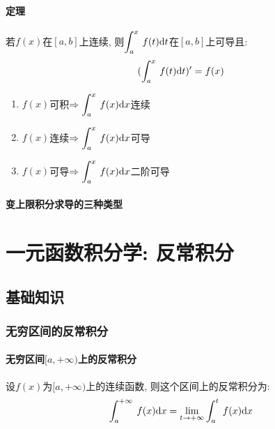 \subsubsection{定理}
若$ f(x) $在$ [a,b] $上连续, 则$ \displaystyle\int_{a}^{x}\hspace{.2em}f(t)\mathrm{d}t $在$ [a,b] $上可导且:
\begin{equation*}
    (\displaystyle\int_{a}^{x}\hspace{.2em}f(t)\mathrm{d}t)'=f(x)
\end{equation*}
\begin{enumerate}
    \item $ f(x) $可积$ \Rightarrow \displaystyle\int_{a}^{x}\hspace{.2em}f(x)\mathrm{d}x $连续
    \item $ f(x) $连续$ \Rightarrow \displaystyle\int_{a}^{x}\hspace{.2em}f(x)\mathrm{d}x $可导
    \item $ f(x) $可导$ \Rightarrow \displaystyle\int_{a}^{x}\hspace{.2em}f(x)\mathrm{d}x $二阶可导
\end{enumerate}
\subsubsection{变上限积分求导的三种类型}

\chapter{一元函数积分学: 反常积分}
\section{基础知识}
\subsection{无穷区间的反常积分}
\subsubsection{无穷区间$ [a,+\infty) $上的反常积分}
                设$ f(x) $为$ [a,+\infty) $上的连续函数, 则这个区间上的反常积分为:
                        \begin{equation*}
                            \displaystyle\int_{a}^{+\infty}\hspace{.2em}f(x)\mathrm{d}x=\lim\limits_{t \rightarrow +\infty}\displaystyle\int_{a}^{t}\hspace{.2em}f(x)\mathrm{d}x
                        \end{equation*}
